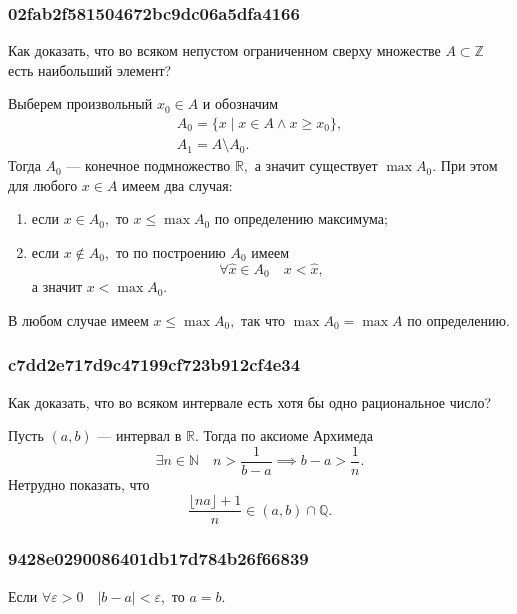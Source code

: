 \documentclass[11pt, a5paper]{article}
\newenvironment{note}[1]{\goodbreak\par\subsubsection{\hfill \color{lightgray}\tiny #1}}{}
\newenvironment{cloze}[2][\ldots]{\begin{leftbar}}{\end{leftbar}}
\newenvironment{icloze}[2][\ldots]{%
  \ignorespaces\text{\tiny \color{lightgray} \{\{c#2:: }%
}{%
  \text{\tiny \color{lightgray}\}\}}\unskip%
}
\begin{document}
    \begin{note}{02fab2f581504672bc9dc06a5dfa4166}
        Как доказать, что во всяком непустом ограниченном сверху множестве \( A
        \subset \mathbb Z \) есть наибольший элемент?

        \begin{cloze}{1}
            Выберем произвольный \( x_0 \in A \) и обозначим \[
                \begin{gathered}
                    A_0 = \{ x \mid x \in A \land x \geqslant x_0 \},  \\
                    A_1 = A \setminus A_0.
                \end{gathered}
            \]
            Тогда \( A_0 \) --- конечное подмножество \( \mathbb R, \) а значит
            существует \( \max A_0. \) При этом для любого \( x \in A \) имеем
            два случая:
            \begin{enumerate}
                \item если \( x \in A_0,  \) то \( x \leqslant \max A_0 \) по
                    определению максимума;
                \item если \( x \not\in A_0,  \) то по построению \( A_0 \)
                    имеем \[ \forall \hat{x} \in A_0 \quad x < \hat{x}, \] а
                    значит \( x < \max A_0. \)
            \end{enumerate}

            В любом случае имеем \( x \leqslant \max A_0, \) так что \( \max A_0
            = \max A \) по определению.
        \end{cloze}
    \end{note}

    \begin{note}{c7dd2e717d9c47199cf723b912cf4e34}
        Как доказать, что во всяком интервале есть хотя бы одно рациональное
        число?

        \begin{cloze}{1}
            Пусть \( (a, b) \) --- интервал в \( \mathbb R. \) Тогда по аксиоме
            Архимеда \[
               \exists n \in \mathbb N \quad n > \frac{1}{b - a} \implies b - a
               > \frac{1}{n}.
            \] Нетрудно показать, что \[
                \dfrac{\lfloor na \rfloor + 1}{n} \in (a, b) \cap \mathbb Q .
            \]
        \end{cloze}
    \end{note}

    \begin{note}{9428e0290086401db17d784b26f66839}
        Если \( \forall \varepsilon > 0 \quad |b - a| < \varepsilon, \) то
        \begin{icloze}{1}\( a = b. \)\end{icloze}
    \end{note}
\end{document}
